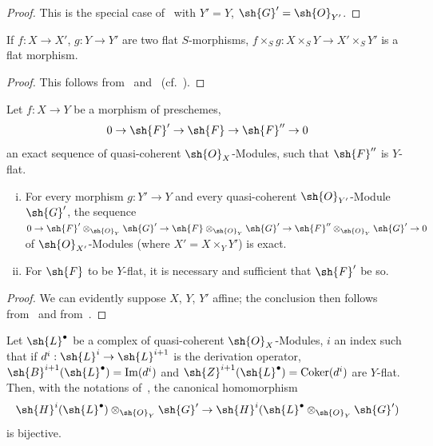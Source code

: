 \begin{proof}
This is the special case of~ with $Y'=Y$, $\sh{G}'=\sh{O}_{Y'}$.
\end{proof}

\begin{corollary}[2.1.7]
\label{IV.2.1.7}
If $f:X\to X'$, $g:Y\to Y'$ are two flat $S$-morphisms, $f\times_S g:X\times_S Y\to X'\times_S Y'$ is a flat morphism.
\end{corollary}

\begin{proof}
This follows from~ and~ (cf.~).
\end{proof}

\begin{proposition}[2.1.8]
\label{IV.2.1.8}
Let $f:X\to Y$ be a morphism of preschemes,
\[
  0 \to \sh{F}' \to \sh{F} \to \sh{F}'' \to 0
\]
an exact sequence of quasi-coherent $\sh{O}_X$-Modules, such that $\sh{F}''$ is $Y$-flat.
\begin{enumerate}[(i)]
  \item For every morphism $g:Y'\to Y$ and every quasi-coherent $\sh{O}_{Y'}$-Module $\sh{G}'$, the sequence
    $0\to\sh{F}'\otimes_{\sh{O}_Y}\sh{G}'\to\sh{F}\otimes_{\sh{O}_Y}\sh{G}'\to\sh{F}''\otimes_{\sh{O}_Y}\sh{G}'\to 0$ of $\sh{O}_{X'}$-Modules \textnormal{(}where $X'=X\times_Y Y'$\textnormal{)} is exact.
  \item For $\sh{F}$ to be $Y$-flat, it is necessary and sufficient that $\sh{F}'$ be so.
\end{enumerate}
\end{proposition}

\begin{proof}
We can evidently suppose $X$, $Y$, $Y'$ affine; the conclusion then follows from~ and from~.
\end{proof}

\begin{corollary}[2.1.9]
\label{IV.2.1.9}
Let $\sh{L}^\bullet$ be a complex of quasi-coherent $\sh{O}_X$-Modules, $i$ an index such that if $d^i:\sh{L}^i\to\sh{L}^{i+1}$ is the derivation operator, $\sh{B}^{i+1}(\sh{L}^\bullet)=\operatorname{Im}(d^i)$ and $\sh{Z}^{i+1}(\sh{L}^\bullet)=\operatorname{Coker}(d^i)$ are $Y$-flat.
Then, with the notations of~, the canonical homomorphism
\[
  \sh{H}^i(\sh{L}^\bullet)\otimes_{\sh{O}_Y}\sh{G}' \to \sh{H}^i(\sh{L}^\bullet\otimes_{\sh{O}_Y}\sh{G}')
\]
is bijective.
\end{corollary}

